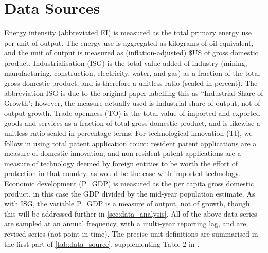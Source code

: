 \documentclass[11pt,a4paper]{article}
\begin{document}
\section{Data Sources}\label{sec:data_sources}
Energy intensity (abbreviated EI) is measured as the total primary energy use per unit of output. 
The energy use is aggregated as kilograms of oil equivalent, and the unit of output is measured as (inflation-adjusted) \$US of gross domestic product.
Industrialisation (ISG) is the total value added of industry (mining, manufacturing, construction, electricity, water, and gas) as a fraction of the total gross domestic product, and is therefore a unitless ratio (scaled in percent).
The abbreviation ISG is due to the original paper labelling this as ``Industrial Share of Growth"; however, the measure actually used is industrial share of output, not of output growth.
Trade openness (TO) is the total value of imported and exported goods and services as a fraction of total gross domestic product, and is likewise a unitless ratio scaled in percentage terms.
For technological innovation (TI), we follow \cite{panHowIndustrializationTrade2019} in using total patent application count: resident patent applications are a measure of domestic innovation, and non-resident patent applications are a measure of technology deemed by foreign entities to be worth the effort of protection in that country, as would be the case with imported technology.
Economic development (P\_GDP) is measured as the per capita gross domestic product, in this case the GDP divided by the mid-year population estimate. 
As with ISG, the variable P\_GDP is a measure of output, not of growth, though this will be addressed further in \cref{sec:data_analysis}. 
All of the above data series are sampled at an annual frequency, with a multi-year reporting lag, and are revised series (not point-in-time).
The precise unit definitions are summarised in the first part of \cref{tab:data_source}, supplementing Table 2 in \cite{panHowIndustrializationTrade2019}.
\end{document}
